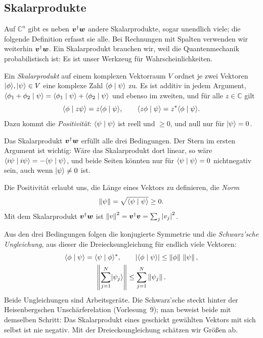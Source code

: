 \subsection{Skalarprodukte}
Auf $\mathbb{C}^n$ gibt es neben $\boldsymbol{v}^{\dagger}\boldsymbol{w}$ andere Skalarprodukte, sogar unendlich viele; die folgende Definition erfasst sie alle. Bei Rechnungen mit Spalten verwenden wir weiterhin $\boldsymbol{v}^{\dagger}\boldsymbol{w}$. Ein Skalarprodukt brauchen wir, weil die Quantenmechanik probabilistisch ist: Es ist unser Werkzeug für Wahrscheinlichkeiten.

\begin{definition}
	Ein \emph{Skalarprodukt} auf einem komplexen Vektorraum $V$ ordnet je zwei Vektoren $\lvert \phi \rangle,\lvert \psi \rangle\in V$ eine komplexe Zahl $\langle \phi \mid \psi \rangle$ zu. Es ist additiv in jedem Argument, $\langle \phi_1 + \phi_2 \mid \psi \rangle = \langle \phi_1 \mid \psi \rangle + \langle \phi_2 \mid \psi \rangle$ und ebenso im zweiten, und für alle $z\in\mathbb{C}$ gilt
	\begin{equation}
		\langle \phi \mid z\psi \rangle = z\langle \phi \mid \psi \rangle, \qquad \langle z\phi \mid \psi \rangle = z^*\langle \phi \mid \psi \rangle.
	\end{equation}
	Dazu kommt die \emph{Positivität}: $\langle \psi \mid \psi \rangle$ ist reell und $\geq 0$, und null nur für $\lvert \psi \rangle = 0$.
\end{definition}

Das Skalarprodukt $\boldsymbol{v}^{\dagger}\boldsymbol{w}$ erfüllt alle drei Bedingungen. Der Stern im ersten Argument ist wichtig: Wäre das Skalarprodukt dort linear, so wäre $\langle i\psi \mid i\psi \rangle = -\langle \psi \mid \psi \rangle$, und beide Seiten könnten nur für $\langle \psi \mid \psi \rangle = 0$ nichtnegativ sein, auch wenn $\lvert \psi \rangle \neq 0$ ist.

Die Positivität erlaubt uns, die Länge eines Vektors zu definieren, die \emph{Norm}
\begin{equation}
	\left\lVert \psi \right\rVert = \sqrt{\langle \psi \mid \psi \rangle} \geq 0.
\end{equation}
Mit dem Skalarprodukt $\boldsymbol{v}^{\dagger}\boldsymbol{w}$ ist $\left\lVert v \right\rVert^2 = \boldsymbol{v}^{\dagger}\boldsymbol{v} = \sum_j\left\lvert v_j \right\rvert^2$.

Aus den drei Bedingungen folgen die konjugierte Symmetrie und die \emph{Schwarz'sche Ungleichung}, aus dieser die Dreiecksungleichung für endlich viele Vektoren:
\begin{equation}
	\begin{gathered}
		\langle \phi \mid \psi \rangle = \langle \psi \mid \phi \rangle^*, \qquad
		\left\lvert \langle \phi \mid \psi \rangle \right\rvert \leq \left\lVert \phi \right\rVert\,\left\lVert \psi \right\rVert, \\
		\left\lVert \sum_{j=1}^{N}\lvert \psi_j \rangle \right\rVert \leq \sum_{j=1}^{N}\left\lVert \psi_j \right\rVert.
	\end{gathered}
\end{equation}
Beide Ungleichungen sind Arbeitsgeräte. Die Schwarz'sche steckt hinter der Heisenbergschen Unschärferelation (Vorlesung~9); man beweist beide mit demselben Schritt: Das Skalarprodukt eines geschickt gewählten Vektors mit sich selbst ist nie negativ. Mit der Dreiecksungleichung schätzen wir Größen ab.

